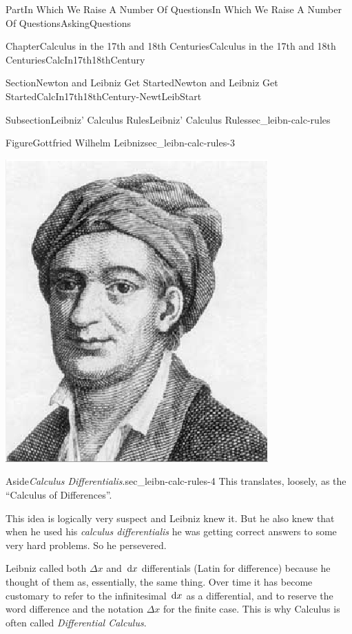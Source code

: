 \documentclass[oneside,10pt,]{book}
\numberwithin{equation}{part}
\newcommand{\dx}[1]{\,{\rm d}#1}
\begin{document}
\begin{partptx}{Part}{In Which We Raise A Number Of Questions}{}{In Which We Raise A Number Of Questions}{}{}{AskingQuestions}
\begin{chapterptx}{Chapter}{Calculus in the 17th and 18th Centuries}{}{Calculus in the 17th and 18th Centuries}{}{}{CalcIn17th18thCentury}
\begin{sectionptx}{Section}{Newton and Leibniz Get Started}{}{Newton and Leibniz Get Started}{}{}{CalcIn17th18thCentury-NewtLeibStart}
\begin{subsectionptx}{Subsection}{Leibniz' Calculus Rules}{}{Leibniz' Calculus Rules}{}{}{sec_leibn-calc-rules}
\begin{figureptx}{Figure}{Gottfried Wilhelm Leibniz}{sec_leibn-calc-rules-3}{}
\begin{image}{0.325}{0.35}{0.325}{}
\includegraphics[width=\linewidth]{external/images/Leibniz.png}
\end{image}%
\tcblower
\end{figureptx}%
\begin{aside}{Aside}{\textit{Calculus Differentialis}.}{sec_leibn-calc-rules-4}%
This translates, loosely, as the ``Calculus of Differences''.%
\end{aside}
This idea is logically very suspect and Leibniz knew it.  But he also knew that when he used his \textit{calculus differentialis} he was getting correct answers to some very hard problems.  So he persevered.%
\par
Leibniz called both \(\Delta x\) and \(\dx{ x}\) differentials (Latin for difference) because he thought of them as, essentially, the same thing.  Over time it has become customary to refer to the infinitesimal \(\dx{ x}\) as a differential, and to reserve the word difference and the notation \(\Delta x\) for the finite case.  This is why Calculus is often called \emph{Differential Calculus}.%
\par

\end{subsectionptx}
\end{sectionptx}
\end{chapterptx}
\end{partptx}
\end{document}
